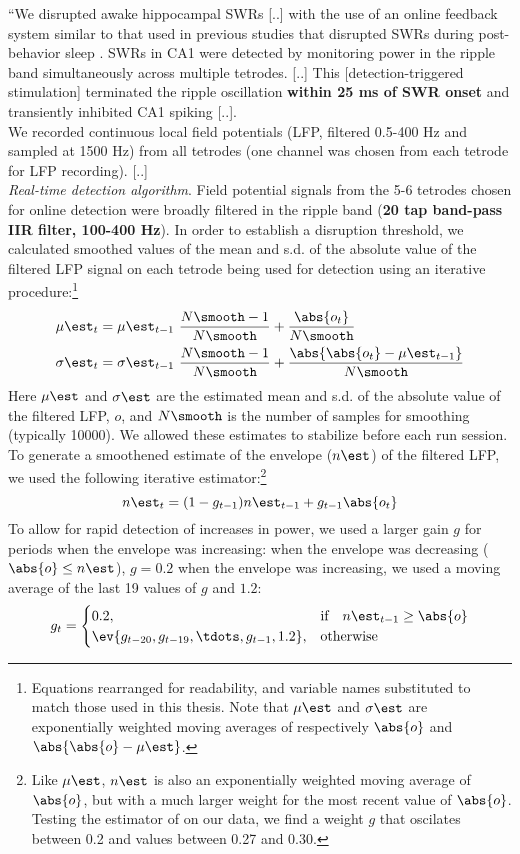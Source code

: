 \begin{quotebar}
``We disrupted awake hippocampal SWRs [..] with the use of an online feedback system similar to that used in previous studies that disrupted SWRs during post-behavior sleep \cite{Girardeau2009,Ego-Stengel2009}. SWRs in CA1 were detected by monitoring power in the ripple band simultaneously across multiple tetrodes. [..] This [detection-triggered stimulation] terminated the ripple oscillation \textbf{within 25 ms of SWR onset} and transiently inhibited CA1 spiking [..].\\
We recorded continuous local field potentials (LFP, filtered 0.5-400 Hz and sampled at 1500 Hz) from all tetrodes (one channel was chosen from each tetrode for LFP recording). [..]\\
\emph{Real-time detection algorithm}. Field potential signals from the 5-6 tetrodes chosen for online detection were broadly filtered in the ripple band (\textbf{20 tap band-pass IIR filter, 100-400 Hz}). In order to establish a disruption threshold, we calculated smoothed values of the mean and s.d. of the absolute value of the filtered LFP signal on each tetrode being used for detection using an iterative procedure:\footnote{Equations rearranged for readability, and variable names substituted to match those used in this thesis. Note that $\mu\est$ and $\sigma\est$ are exponentially weighted moving averages of respectively $\abs{o}$ and $\abs{\abs{o} - \mu\est}$. }
\begin{align*}
\mu\est_t &= \mu\est_{t-1} \ \frac{N\smooth - 1}{N\smooth}
                + \frac{\abs{o_t}}{N\smooth} \\
\sigma\est_t &= \sigma\est_{t-1} \ \frac{N\smooth - 1}{N\smooth}
                + \frac{\abs{\abs{o_t} - \mu\est_{t-1}}}{N\smooth}
\end{align*}
Here $\mu\est$ and $\sigma\est$ are the estimated mean and s.d. of the absolute value of the filtered LFP, $o$, and $N\smooth$ is the  number of samples for smoothing (typically 10000). We allowed these estimates to stabilize before each run session. To generate a smoothened estimate of the envelope ($n\est$) of the filtered LFP, we used the following iterative estimator:\footnote{Like $\mu\est$, $n\est$ is also an exponentially weighted moving average of $\abs{o}$, but with a much larger weight for the most recent value of $\abs{o}$. Testing the estimator of \citeauthor*{Jadhav2012} on our data, we find a weight $g$ that oscilates between 0.2 and values between 0.27 and 0.30.}
\[
n\est_t = (1 - g_{t-1}) n\est_{t-1} + g_{t-1} \abs{o_t}
\]
To allow for rapid detection of increases in power, we used a larger gain $g$ for periods when the envelope was increasing: when the envelope was decreasing ($\abs{o} \le n\est$), $g = 0.2$ when the envelope was increasing, we used a moving average of the last 19 values of $g$ and $1.2$:
\[
g_t = 
\begin{cases}
    0.2,    & \text{if}\quad n\est_{t-1} \geq \abs{o} \\
    \ev{g_{t-20}, g_{t-19}, \tdots, g_{t-1}, 1.2},  & \text{otherwise}
\end{cases}
\]


\end{quotebar}
